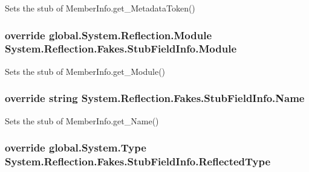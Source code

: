 Sets the stub of Member\-Info.\-get\-\_\-\-Metadata\-Token()

\hypertarget{class_system_1_1_reflection_1_1_fakes_1_1_stub_field_info_a51988f08e49b1049609685373dd2ec0f}{
\subsubsection[{Module}]{\setlength{\rightskip}{0pt plus 5cm}override global.\-System.\-Reflection.\-Module System.\-Reflection.\-Fakes.\-Stub\-Field\-Info.\-Module\hspace{0.3cm}{\ttfamily [get]}}}\label{class_system_1_1_reflection_1_1_fakes_1_1_stub_field_info_a51988f08e49b1049609685373dd2ec0f}


Sets the stub of Member\-Info.\-get\-\_\-\-Module()

\hypertarget{class_system_1_1_reflection_1_1_fakes_1_1_stub_field_info_a9606303f42cf3e0862b5811a4aaeb7cf}{
\subsubsection[{Name}]{\setlength{\rightskip}{0pt plus 5cm}override string System.\-Reflection.\-Fakes.\-Stub\-Field\-Info.\-Name\hspace{0.3cm}{\ttfamily [get]}}}\label{class_system_1_1_reflection_1_1_fakes_1_1_stub_field_info_a9606303f42cf3e0862b5811a4aaeb7cf}


Sets the stub of Member\-Info.\-get\-\_\-\-Name()

\hypertarget{class_system_1_1_reflection_1_1_fakes_1_1_stub_field_info_a129ea3663305cab540708fd0e934a445}{
\subsubsection[{Reflected\-Type}]{\setlength{\rightskip}{0pt plus 5cm}override global.\-System.\-Type System.\-Reflection.\-Fakes.\-Stub\-Field\-Info.\-Reflected\-Type\hspace{0.3cm}{\ttfamily [get]}}}\label{class_system_1_1_reflection_1_1_fakes_1_1_stub_field_info_a129ea3663305cab540708fd0e934a445}


